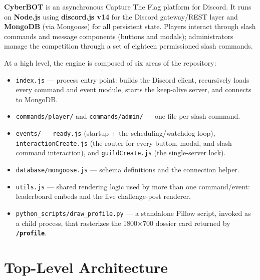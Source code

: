 \documentclass[12pt,a4paper]{report}
\newcommand{\cmd}[1]{\texttt{\color{cybercyan}\textbf{#1}}}
\newcommand{\file}[1]{\texttt{\color{cyberpurple!80!black}#1}}
\begin{document}
\textbf{CyberBOT} is an asynchronous Capture The Flag platform for Discord. It runs on
\textbf{Node.js} using \textbf{discord.js v14} for the Discord gateway/REST layer and
\textbf{MongoDB} (via Mongoose) for all persistent state. Players interact through slash commands
and message components (buttons and modals); administrators manage the competition through a set
of eighteen permissioned slash commands.

At a high level, the engine is composed of six areas of the repository:

\begin{itemize}
    \item \file{index.js} --- process entry point: builds the Discord client, recursively loads
          every command and event module, starts the keep-alive server, and connects to MongoDB.
    \item \file{commands/player/} and \file{commands/admin/} --- one file per slash command.
    \item \file{events/} --- \file{ready.js} (startup + the scheduling/watchdog loop),
          \file{interactionCreate.js} (the router for every button, modal, and slash command
          interaction), and \file{guildCreate.js} (the single-server lock).
    \item \file{database/mongoose.js} --- schema definitions and the connection helper.
    \item \file{utils.js} --- shared rendering logic used by more than one command/event:
          leaderboard embeds and the live challenge-post renderer.
    \item \file{python\_scripts/draw\_profile.py} --- a standalone Pillow script, invoked as a
          child process, that rasterizes the 1800$\times$700 dossier card returned by
          \cmd{/profile}.
\end{itemize}

\section{Top-Level Architecture}
\end{document}
